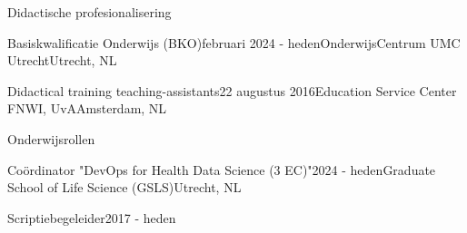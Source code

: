 \begin{rSection}{Didactische profesionalisering}
\begin{rSubsection}{Basiskwalificatie Onderwijs (BKO)}{februari 2024 - heden}{OnderwijsCentrum UMC Utrecht}{Utrecht, NL}
  \vspace{-1.5em}
\end{rSubsection}
\begin{rSubsection}{Didactical training teaching-assistants}{22 augustus 2016}{Education Service Center FNWI, UvA}{Amsterdam, NL}
  \vspace{-1.5em}
\end{rSubsection}
\end{rSection}

\begin{rSection}{Onderwijsrollen}
\begin{rSubsection}{Co\"{o}rdinator "DevOps for Health Data Science (3 EC)"}{2024 - heden}{Graduate School of Life Science (GSLS)}{Utrecht, NL}
  \vspace{-1.5em}
\end{rSubsection}

\begin{rSubsection}{Scriptiebegeleider}{2017 - heden}{}{}
   \vspace{-1.5em}
      
\end{rSubsection}

\end{rSection}

